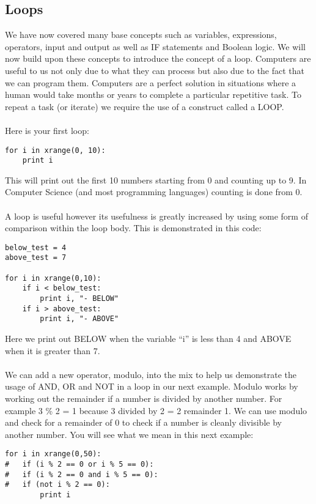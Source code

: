 \documentclass[twocolumn]{article}
\begin{document}
\subsection{Loops}
We have now covered many base concepts such as variables, expressions, operators, input and output as well as IF statements and Boolean logic. We will now build upon these concepts to introduce the concept of a loop. Computers are useful to us not only due to what they can process but also due to the fact that we can program them. Computers are a perfect solution in situations where a human would take months or years to complete a particular repetitive task. To repeat a task (or iterate) we require the use of a construct called a LOOP.\\
\\
Here is your first loop:
\begin{lstlisting}
for i in xrange(0, 10):
	print i
\end{lstlisting}
This will print out the first 10 numbers starting from 0 and counting up to 9. In Computer Science (and most programming languages) counting is done from 0.\\
\\
A loop is useful however its usefulness is greatly increased by using some form of comparison within the loop body. This is demonstrated in this code:
\begin{lstlisting}
below_test = 4
above_test = 7

for i in xrange(0,10):
	if i < below_test:
		print i, "- BELOW"
	if i > above_test:
		print i, "- ABOVE"
\end{lstlisting}
Here we print out BELOW when the variable ``i'' is less than 4 and ABOVE when it is greater than 7.\\
\\
We can add a new operator, modulo, into the mix to help us demonstrate the usage of AND, OR and NOT in a loop in our next example. Modulo works by working out the remainder if a number is divided by another number. For example 3 \% 2 = 1 because 3 divided by 2 = 2 remainder 1. We can use modulo and check for a remainder of 0 to check if a number is cleanly divisible by another number. You will see what we mean in this next example:
 \begin{lstlisting}
for i in xrange(0,50):
#	if (i % 2 == 0 or i % 5 == 0):
#	if (i % 2 == 0 and i % 5 == 0):
#	if (not i % 2 == 0):
		print i
\end{lstlisting}
\end{document}
